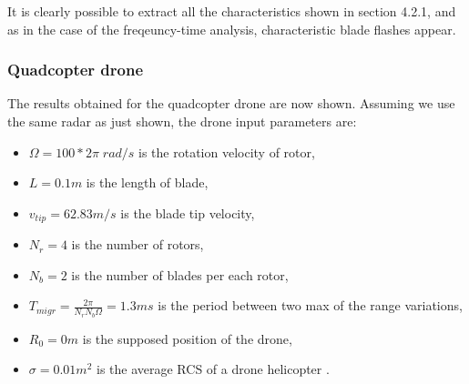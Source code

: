  It is clearly possible to extract all the characteristics shown in section 4.2.1, and as in the case of the freqeuncy-time analysis, characteristic blade flashes appear.
 
 \subsubsection{Quadcopter drone}
 
 The results obtained for the quadcopter drone are now shown. Assuming we use the same radar as just shown, the drone input parameters are:
 
 \begin{itemize}
    
    \item $\Omega = 100*2\pi\; rad/s$ is the rotation velocity of rotor,
         
    \item $L = 0.1 m$ is the length of blade,

    \item $v_{tip} = 62.83 m/s$ is the blade tip velocity,
    
    \item $N_r = 4$ is the number of rotors,
    
    \item $N_b = 2$ is the number of blades per each rotor,
    
    \item $T_{migr} = \frac{2\pi}{N_r N_b \Omega} = 1.3 ms$ is the period between two max of the range variations, 
    
    \item $R_0 = 0m$ is the supposed position of the drone,
    
    \item $\sigma = 0.01 m^{2}$ is the average RCS of a drone helicopter \cite{rcsdrone}.
    
\end{itemize}

